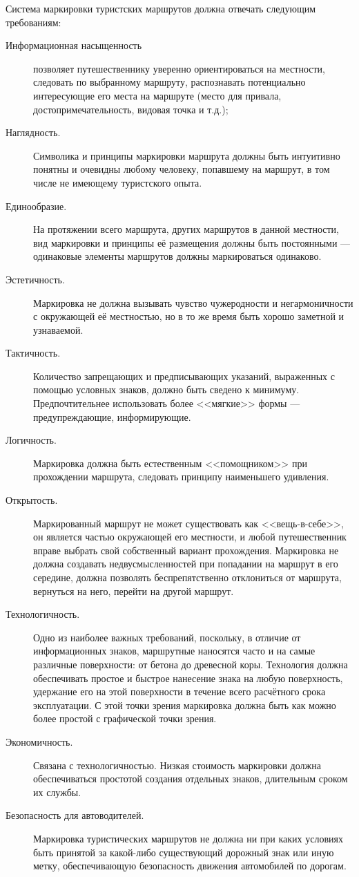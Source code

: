 \documentclass[a4paper,12pt]{extarticle}
\begin{document}
Система маркировки туристских маршрутов должна отвечать следующим требованиям:
\begin{description}
	\item[Информационная насыщенность] позволяет путешественнику уверенно ориентироваться на местности, следовать по
		выбранному маршруту, распознавать потенциально интересующие его места на маршруте (место для привала,
		достопримечательность, видовая точка и т.д.);
	\item[Наглядность.] Символика и принципы маркировки маршрута должны быть интуитивно понятны и очевидны любому
		человеку, попавшему на маршрут, в том числе не имеющему туристского опыта.
	\item[Единообразие.] На протяжении всего маршрута, других маршрутов в данной местности, вид маркировки и
		принципы её размещения должны быть постоянными --- одинаковые элементы маршрутов должны маркироваться
		одинаково.
	\item[Эстетичность.] Маркировка не должна вызывать чувство чужеродности и негармоничности с окружающей её
		местностью, но в то же время быть хорошо заметной и узнаваемой.
	\item[Тактичность.] Количество запрещающих и предписывающих указаний, выраженных с помощью условных знаков,
		должно быть сведено к минимуму. Предпочтительнее использовать более <<мягкие>> формы ---
		предупреждающие, информирующие.
	\item[Логичность.] Маркировка должна быть естественным <<помощником>> при прохождении маршрута, следовать
		принципу наименьшего удивления.
	\item[Открытость.] Маркированный маршрут не может существовать как <<вещь-в-себе>>, он является частью окружающей
		его местности, и любой путешественник вправе выбрать свой собственный вариант прохождения. Маркировка не
		должна создавать недвусмысленностей при попадании на маршрут в его середине, должна позволять
		беспрепятственно отклониться от маршрута, вернуться на него, перейти на другой маршрут.
	\item[Технологичность.] Одно из наиболее важных требований, поскольку, в отличие от информационных знаков,
		маршрутные наносятся часто и на самые различные поверхности: от бетона до древесной коры.
		Технология должна обеспечивать простое и быстрое нанесение знака на любую поверхность, удержание его на
		этой поверхности в течение всего расчётного срока эксплуатации. С этой точки зрения маркировка должна
		быть как можно более простой с графической точки зрения.
	\item[Экономичность.] Связана с технологичностью. Низкая стоимость маркировки должна обеспечиваться простотой
		создания отдельных знаков, длительным сроком их службы.
	\item[Безопасность для автоводителей.] Маркировка туристических маршрутов не должна ни при каких условиях быть
		принятой за какой-либо существующий дорожный знак или иную метку, обеспечивающую безопасность движения
		автомобилей по дорогам.
\end{description}
\end{document}
